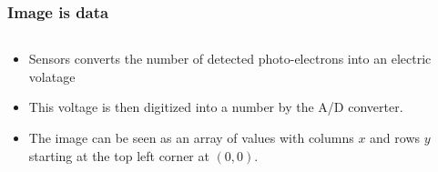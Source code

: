 \documentclass[ignorenonframetext,aspectratio=169,10pt,xcolor=table]{beamer}
\begin{document}
\begin{frame} \frametitle{Image is data}
  \begin{columns}
    \begin{column}{.6\textwidth}
      \begin{itemize}
      \item Sensors converts the number of detected photo-electrons
        into an electric volatage
      \item This voltage is then digitized into a number by the A/D
        converter.
      \item The image can be seen as an array of values with columns
        $x$ and rows $y$ starting at the top left corner at $(0,0)$.
      \end{itemize}
      \end{column}
    \begin{column}{.4\textwidth} 
    \end{column}
  \end{columns}
\end{frame}
\end{document}
